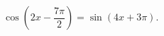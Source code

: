 \begin{ex}[type=equation]
	\begin{condition}
		$\ \cos{\left(2x - \dfrac{7\pi}{2}\right)} = \sin {(4x + 3\pi)}. $
	\end{condition}
\end{ex}